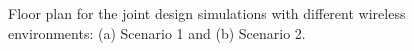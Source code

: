 \documentclass[journal,12pt,onecolumn,draftclsnofoot,]{IEEEtran}
\begin{document}
\begin{figure}
\centering
{}
\quad
{}
\caption{Floor plan for the joint design simulations with different wireless environments: (a) Scenario 1 and (b) Scenario 2.}
\label{g} 
\vspace{-10mm}
\end{figure}
\end{document}
